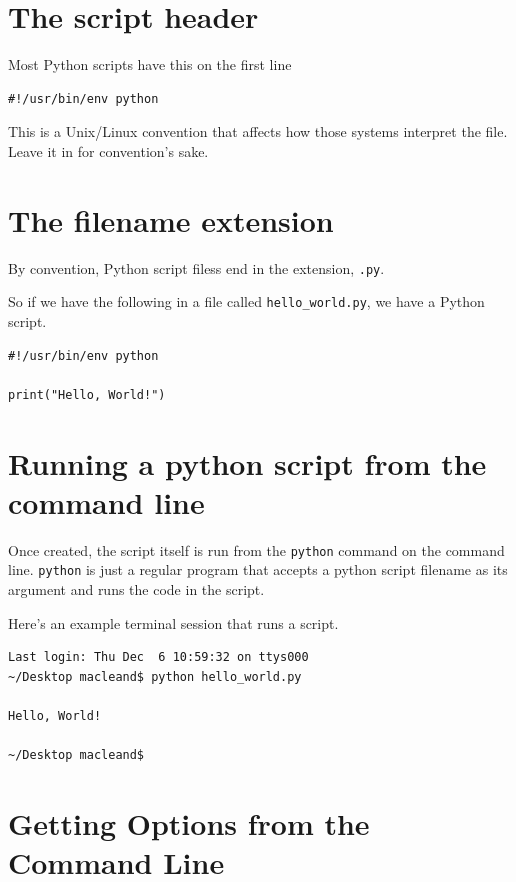\documentclass[]{book}
\theoremstyle{definition}
\theoremstyle{definition}
\theoremstyle{definition}
\theoremstyle{remark}
\begin{document}
\hypertarget{the-script-header}{%
\section{The script header}\label{the-script-header}}

Most Python scripts have this on the first line

\begin{verbatim}
#!/usr/bin/env python
\end{verbatim}

This is a Unix/Linux convention that affects how those systems interpret
the file. Leave it in for convention's sake.

\hypertarget{the-filename-extension}{%
\section{The filename extension}\label{the-filename-extension}}

By convention, Python script filess end in the extension, \texttt{.py}.

So if we have the following in a file called \texttt{hello\_world.py},
we have a Python script.

\begin{verbatim}
#!/usr/bin/env python

print("Hello, World!")
\end{verbatim}

\hypertarget{running-a-python-script-from-the-command-line}{%
\section{Running a python script from the command
line}\label{running-a-python-script-from-the-command-line}}

Once created, the script itself is run from the \texttt{python} command
on the command line. \texttt{python} is just a regular program that
accepts a python script filename as its argument and runs the code in
the script.

Here's an example terminal session that runs a script.

\begin{verbatim}
Last login: Thu Dec  6 10:59:32 on ttys000
~/Desktop macleand$ python hello_world.py

Hello, World!

~/Desktop macleand$
\end{verbatim}

\hypertarget{getting-options-from-the-command-line}{%
\section{Getting Options from the Command
Line}\label{getting-options-from-the-command-line}}
\end{document}
